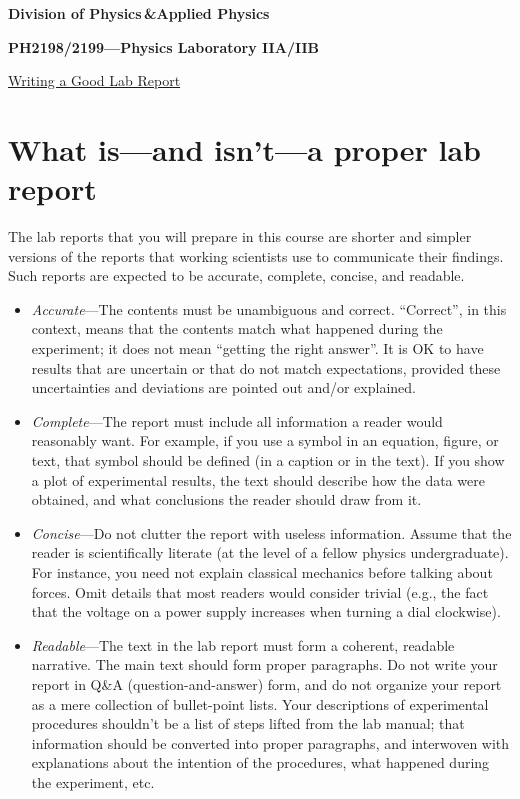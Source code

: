 \documentclass[11pt,a4paper]{article}
\begin{document}
\begin{center}
\textbf{Division of Physics\;\,\&\;Applied Physics}

\textbf{PH2198/2199---Physics Laboratory IIA/IIB}

\vskip 0.05in

\underline{\Huge Writing a Good Lab Report}
\end{center}

\section{What is---and isn't---a proper lab report}

The lab reports that you will prepare in this course are shorter and
simpler versions of the reports that working scientists use to
communicate their findings.  Such reports are expected to be accurate,
complete, concise, and readable.

\begin{itemize}
\item \textit{Accurate}---The contents must be unambiguous and
  correct.  ``Correct'', in this context, means that the contents
  match what happened during the experiment; it does not mean
  ``getting the right answer''.  It is OK to have results that are
  uncertain or that do not match expectations, provided these
  uncertainties and deviations are pointed out and/or explained.

\item \textit{Complete}---The report must include all information a
  reader would reasonably want.  For example, if you use a symbol in
  an equation, figure, or text, that symbol should be defined (in a
  caption or in the text).  If you show a plot of experimental
  results, the text should describe how the data were obtained, and
  what conclusions the reader should draw from it.

\item \textit{Concise}---Do not clutter the report with useless
  information.  Assume that the reader is scientifically literate (at
  the level of a fellow physics undergraduate).  For instance, you
  need not explain classical mechanics before talking about forces.
  Omit details that most readers would consider trivial (e.g., the
  fact that the voltage on a power supply increases when turning a
  dial clockwise).

\item \textit{Readable}---The text in the lab report must form a
  coherent, readable narrative.  The main text should form proper
  paragraphs.  Do not write your report in Q\&A (question-and-answer)
  form, and do not organize your report as a mere collection of
  bullet-point lists.  Your descriptions of experimental procedures
  shouldn't be a list of steps lifted from the lab manual; that
  information should be converted into proper paragraphs, and
  interwoven with explanations about the intention of the procedures,
  what happened during the experiment, etc.
\end{itemize}
\end{document}
